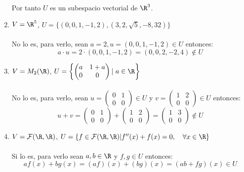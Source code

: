 \begin{ejercicio}
\begin{enumerate}[label=\alph*)]
		      Por tanto $U$ es un subespacio vectorial de $\R^3$.
		\item $V = \R^5$, $U = \{(0,0,1,-1,2), (3,2,\sqrt{5},-8,32)\}$
		      \\ \\No lo es, para verlo, sean $a = 2, u = (0,0,1,-1,2) \in U$ entonces:
		      \begin{equation*}
			      a \cdot u = 2 \cdot (0,0,1,-1,2) = (0,0,2,-2,4) \notin U
		      \end{equation*}
		\item $V = M_2(\R)$, $U = \left\{\begin{pmatrix}
				      a & 1 + a \\
				      0 & 0
			      \end{pmatrix} \arrowvert \ a \in \R \right\}$
		      \\ \\ No lo es, para verlo, sean $u = \begin{pmatrix}
				      0 & 1 \\
				      0 & 0
			      \end{pmatrix} \in U$ y $v = \begin{pmatrix}
				      1 & 2 \\
				      0 & 0
			      \end{pmatrix} \in U$ entonces:
		      \begin{equation*}
			      u + v = \begin{pmatrix}
				      0 & 1 \\
				      0 & 0
			      \end{pmatrix} + \begin{pmatrix}
				      1 & 2 \\
				      0 & 0
			      \end{pmatrix} = \begin{pmatrix}
				      1 & 3 \\
				      0 & 0
			      \end{pmatrix} \notin U
		      \end{equation*}
		\item $V = \mathcal{F(\R,\R)}$, $U = \{f \in \mathcal{F(\R,\R)} | f''(x) + f(x) = 0, \quad \forall x \in \R\}$
		      \\ \\ Si lo es, para verlo sean $a,b \in \R$ y $f,g \in U$ entonces:
		      \begin{equation*}
			      af(x) + bg(x) = (af)(x) + (bg)(x) = (ab + fg)(x) \in U
		      \end{equation*}

\end{enumerate}
\end{ejercicio}
